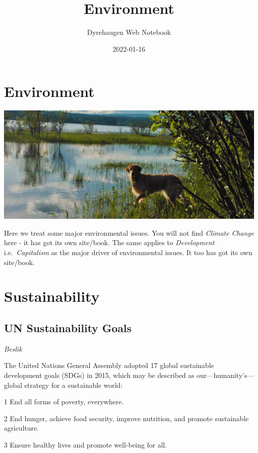 \documentclass[
]{book}
\title{Environment}
\author{Dyrehaugen Web Notebook}
\date{2022-01-16}
\begin{document}
\maketitle

{
\setcounter{tocdepth}{1}
\tableofcontents
}
\hypertarget{environment}{%
\chapter{Environment}\label{environment}}

\includegraphics{fig/zelda.jpg}

Here we treat some major environmental issues.
You will not find \emph{Climate Change} here - it has got its own site/book.
The same applies to \emph{Development} i.e.~\emph{Capitalism} as the major
driver of environmental issues.
It too has got its own site/book.

\hypertarget{sustainability}{%
\chapter{Sustainability}\label{sustainability}}

\hypertarget{un-sustainability-goals}{%
\section{UN Sustainability Goals}\label{un-sustainability-goals}}

\emph{Beslik}

The United Nations General Assembly adopted 17 global sustainable development goals (SDGs) in 2015, which may be described as our---humanity's---global strategy for a sustainable world:

1 End all forms of poverty, everywhere.

2 End hunger, achieve food security, improve nutrition, and promote sustainable agriculture.

3 Ensure healthy lives and promote well-being for all.
\end{document}
